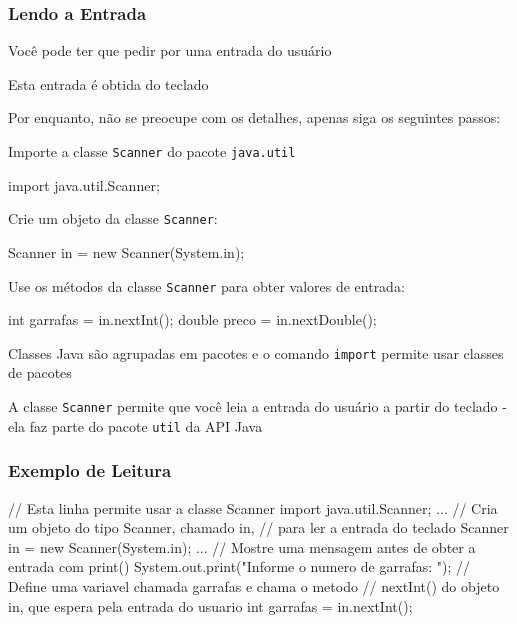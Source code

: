 \documentclass[xcolor={dvipsnames,table},aspectratio=169]{beamer}
\begin{document}
\begin{frame}[fragile]\frametitle{Lendo a Entrada}
\begin{itemize}
{\scriptsize
	\item Você pode ter que pedir por uma entrada do usuário
	\item Esta entrada é obtida do teclado
	\item Por enquanto, não se preocupe com os detalhes, apenas siga os seguintes passos:
	\begin{enumerate}
{\scriptsize
		\item Importe a classe \texttt{Scanner} do pacote \texttt{java.util}
{\scriptsize
\begin{javacode}
import java.util.Scanner;
\end{javacode}
}
		\item Crie um objeto da classe \texttt{Scanner}:
{\scriptsize
\begin{javacode}
Scanner in = new Scanner(System.in);
\end{javacode}
}
		\item Use os métodos da classe \texttt{Scanner} para obter valores de entrada:
{\scriptsize
\begin{javacode}
int garrafas = in.nextInt();
double preco = in.nextDouble();
\end{javacode}
}
}
	\end{enumerate}
	\item Classes Java são agrupadas em pacotes e o comando \texttt{import} permite usar classes de pacotes
	\item A classe \texttt{Scanner} permite que você leia a entrada do usuário a partir do teclado - ela faz parte do pacote \texttt{util} da API Java
}
\end{itemize}
\end{frame}

\begin{frame}[fragile]\frametitle{Exemplo de Leitura}
\begin{javacode}
// Esta linha permite usar a classe Scanner
import java.util.Scanner;
...
// Cria um objeto do tipo Scanner, chamado in,
// para ler a entrada do teclado
Scanner in = new Scanner(System.in);
...
// Mostre uma mensagem antes de obter a entrada com print()
System.out.print("Informe o numero de garrafas: ");
// Define uma variavel chamada garrafas e chama o metodo
// nextInt() do objeto in, que espera pela entrada do usuario
int garrafas = in.nextInt();
\end{javacode}
\end{frame}
\end{document}
